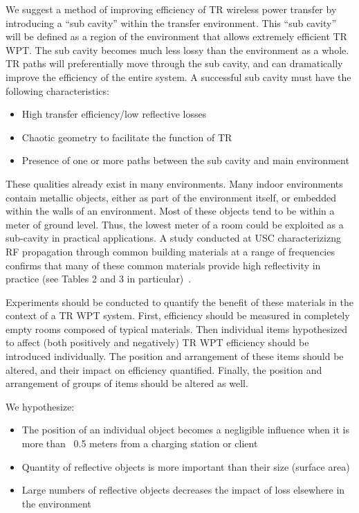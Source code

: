We suggest a method of improving efficiency of TR wireless power transfer by introducing a ``sub cavity'' within the transfer environment. This ``sub cavity'' will be defined as a region of the environment that allows extremely efficient TR WPT. The sub cavity becomes much less lossy than the environment as a whole. TR paths will preferentially move through the sub cavity, and can dramatically improve the efficiency of the entire system. A successful sub cavity must have the following characteristics:

\begin{itemize}
  \item High transfer efficiency/low reflective losses
  \item Chaotic geometry to facilitate the function of TR
  \item Presence of one or more paths between the sub cavity and main environment
\end{itemize}

These qualities already exist in many environments. Many indoor environments contain metallic objects, either as part of the environment itself, or embedded within the walls of an environment. Most of these objects tend to be within a meter of ground level. Thus, the lowest meter of a room could be exploited as a sub-cavity in practical applications. A study conducted at USC characterizizng RF propagation through common building materials at a range of frequencies confirms that many of these common materials provide high reflectivity in practice (see Tables 2 and 3 in particular)~\cite{common-reflectivity}.

Experiments should be conducted to quantify the benefit of these materials in the context of a TR WPT system. First, efficiency should be measured in completely empty rooms composed of typical materials. Then individual items hypothesized to affect (both positively and negatively) TR WPT efficiency should be introduced individually. The position and arrangement of these items should be altered, and their impact on efficiency quantified. Finally, the position and arrangement of groups of items should be altered as well.

We hypothesize:
\begin{itemize}
  \item The position of an individual object becomes a negligible influence when it is more than ~0.5 meters from a charging station or client
  \item Quantity of reflective objects is more important than their size (surface area)
  \item Large numbers of reflective objects decreases the impact of loss elsewhere in the environment
\end{itemize}


